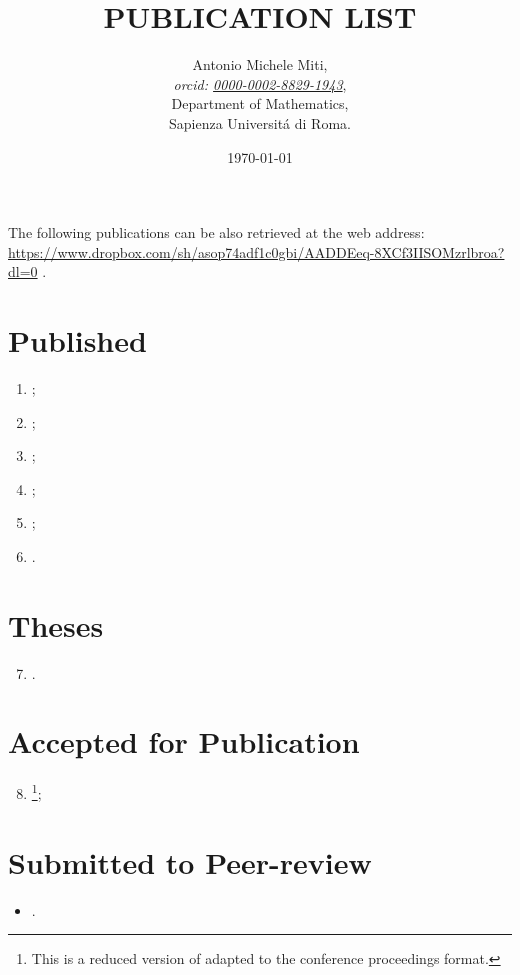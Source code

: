 \documentclass[a4paper]{article}
\title{PUBLICATION LIST}
\date{\today}
\author{
	Antonio Michele Miti,\\
	\emph{orcid: \href{https://orcid.org/0000-0002-8829-1943}{0000-0002-8829-1943}},
	\\
	Department of Mathematics,\\
	Sapienza Universit\'a di Roma.
}
\begin{document}
  

	\maketitle

	\noindent
  The following publications can be also retrieved at the web address:
  \\ 
  \url{https://www.dropbox.com/sh/asop74adf1c0gbi/AADDEeq-8XCf3IISOMzrlbroa?dl=0}
  .


  \section*{Published}
	  \begin{enumerate}
    	\item {};
		\item {};	  
		\item {};		
 		\item {};
 		\item {};
 		\item {}.
	  \end{enumerate}

  \section*{Theses}
	  \begin{enumerate}
		\setcounter{enumi}{6}
 	   \item {}.
	  \end{enumerate}

  \section*{Accepted for Publication}
	  \begin{enumerate}
		\setcounter{enumi}{7}
		\item {}\footnote{This is a reduced version of \cite{Luongo2024} adapted to the conference proceedings format.};
	  \end{enumerate}

  \section*{Submitted to Peer-review}
	  \begin{itemize}
    	   \item {}.
	  \end{itemize}
\end{document}
